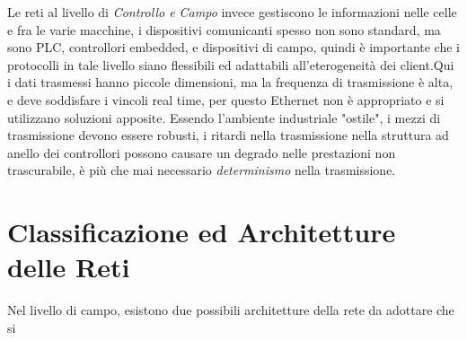\documentclass[10pt, letterpaper]{report}
\begin{document}
Le reti al livello di \textit{Controllo e Campo} invece gestiscono le informazioni nelle celle 
e fra le varie macchine, i dispositivi comunicanti spesso non sono standard, ma sono PLC, controllori embedded, 
e dispositivi di campo, quindi è importante che i protocolli in tale livello siano flessibili ed 
adattabili all'eterogeneità dei client.\acc  Qui i dati trasmessi hanno piccole dimensioni, ma la 
frequenza di trasmissione è alta, e deve soddisfare i vincoli real time, per questo Ethernet non è 
appropriato e si utilizzano soluzioni apposite. Essendo l'ambiente industriale "ostile", i mezzi di 
trasmissione devono essere robusti, i ritardi nella trasmissione nella struttura ad anello dei controllori 
possono causare un degrado nelle prestazioni non trascurabile, è più che mai necessario \textit{determinismo} nella 
trasmissione.
\flowerLine 
\section{Classificazione ed Architetture delle Reti}
Nel livello di campo, esistono due possibili architetture della rete da adottare che si 
\end{document}
